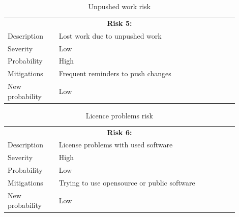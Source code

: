 \vspace{2.5cm}

\begin{table}[H]
  \centering
  \begin{tabular}{|p{0.2\linewidth}p{0.7\linewidth}|}
    \hline
    \multicolumn{2}{|c|}{\textbf{Risk 5:}} \\
    Description     & Lost work due to unpushed work           \\
    Severity        & Low                                 \\
    Probability     & High                                   \\
    Mitigations     & Frequent reminders to push changes  \\
    New probability & Low   \\
    \hline                                
  \end{tabular}
  \caption{Unpushed work risk}
\end{table}

\vspace{2.5cm}

\begin{table}[H]
  \centering
  \begin{tabular}{|p{0.2\linewidth}p{0.7\linewidth}|}
    \hline
    \multicolumn{2}{|c|}{\textbf{Risk 6:}} \\
    Description     & License problems with used software           \\
    Severity        & High                                 \\
    Probability     & Low                                   \\
    Mitigations     & Trying to use opensource or public software  \\
    New probability & Low       \\
    \hline                            
  \end{tabular}
  \caption{Licence problems risk}
\end{table}
